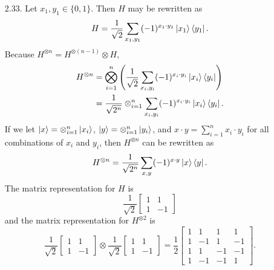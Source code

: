 \documentclass[a4paper,12pt]{article}
\begin{document}
\begin{enumerate}
	\item[2.33.] Let $x_1, y_1 \in \{0, 1\}$. Then $H$ may be rewritten as
	\[ H = \frac{1}{\sqrt{2}} \sum_{x_1, y_1} (-1)^{x_1 \cdot y_1} \ket{x_1} \bra{y_1}. \]
	Because $H^{\otimes n} = H^{\otimes (n - 1)} \otimes H$,
	\begin{align*}
		H^{\otimes n} &= \bigotimes_{i = 1}^{n} \left( \frac{1}{\sqrt{2}} \sum_{x_i, y_i} (-1)^{x_i \cdot y_i} \ket{x_i} \bra{y_i} \right) \\
		&= \frac{1}{\sqrt{2^n}} \otimes_{i = 1}^{n} \sum_{x_i, y_i} (-1)^{x_i \cdot y_i} \ket{x_i} \bra{y_i}.
	\end{align*}
	If we let $\ket{x} = \otimes_{i = 1}^{n} \ket{x_i}$, $\ket{y} = \otimes_{i = 1}^{n} \ket{y_i}$, and $x \cdot y = \sum_{i = 1}^{n} x_i \cdot y_i$ for all combinations of $x_i$ and $y_i$, then $H^{\otimes n}$ can be rewritten as
	\[ H^{\otimes n} = \frac{1}{\sqrt{2^n}} \sum_{x, y} (-1)^{x \cdot y} \ket{x} \bra{y}. \]
	The matrix representation for $H$ is
	\[
        \frac{1}{\sqrt{2}}
        \left[ \begin{array}{cc}
        1 & 1 \\
        1 & -1
        \end{array} \right]
	\]
	and the matrix representation for $H^{\otimes 2}$ is
	\[
        \frac{1}{\sqrt{2}}
        \left[ \begin{array}{cc}
        1 & 1 \\
        1 & -1
        \end{array} \right]
        \otimes \frac{1}{\sqrt{2}}
        \left[ \begin{array}{cc}
        1 & 1 \\
        1 & -1
        \end{array} \right]
        = \frac{1}{2}
        \left[ \begin{array}{cccc}
        1 & 1 & 1 & 1 \\
        1 & -1 & 1 & -1 \\
        1 & 1 & -1 & -1 \\
        1 & -1 & -1 & 1
        \end{array} \right].
	\]
	

\end{enumerate}
\end{document}
